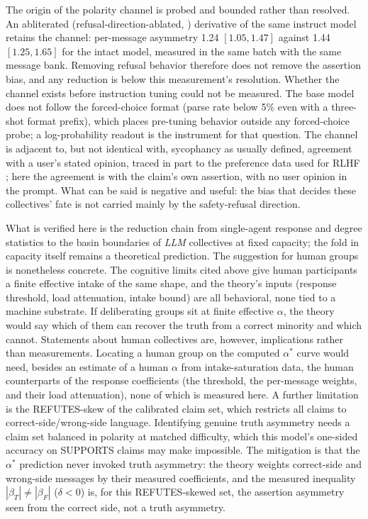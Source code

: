 \documentclass{ieeeaccess}
\newcommand{\astar}{\alpha^{*}}
\begin{document}
The origin of the polarity channel is probed and bounded rather than
resolved. An abliterated (refusal-direction-ablated, \cite{Arditi2024})
derivative of the same instruct model retains the channel: per-message
asymmetry 1.24 $[1.05, 1.47]$ against 1.44 $[1.25, 1.65]$ for the intact
model, measured in the same batch with the same message bank. Removing
refusal behavior therefore does not remove the assertion bias, and any
reduction is below this measurement's resolution. Whether the channel
exists before instruction tuning could not be measured. The base model does
not follow the forced-choice format (parse rate below 5\% even with a
three-shot format prefix), which places pre-tuning behavior outside any
forced-choice probe; a log-probability readout is the instrument for that
question. The channel is adjacent to, but not identical with, sycophancy as
usually defined, agreement with a user's stated opinion, traced in part to
the preference data used for RLHF \cite{Sharma2023}; here the agreement is
with the claim's own assertion, with no user opinion in the prompt. What
can be said is negative and useful: the bias that decides these
collectives' fate is not carried mainly by the safety-refusal direction.

What is verified here is the reduction chain from single-agent response and
degree statistics to the basin boundaries of \emph{LLM} collectives at
fixed capacity; the fold in capacity itself remains a theoretical
prediction. The suggestion for human groups is nonetheless concrete. The
cognitive limits cited above give human participants a finite effective
intake of the same shape, and the theory's inputs (response threshold, load
attenuation, intake bound) are all behavioral, none tied to a machine
substrate. If deliberating groups sit at finite effective $\alpha$, the
theory would say which of them can recover the truth from a correct
minority and which cannot. Statements about human collectives are,
however, implications rather than measurements. Locating a human group on
the computed $\astar$ curve would need, besides an estimate of a human
$\alpha$ from intake-saturation data, the human counterparts of the
response coefficients (the threshold, the per-message weights, and their
load attenuation), none of which is measured here. A further limitation is
the REFUTES-skew of the calibrated claim set, which restricts all claims to
correct-side/wrong-side language. Identifying genuine truth asymmetry needs
a claim set balanced in polarity at matched difficulty, which this model's
one-sided accuracy on SUPPORTS claims may make impossible. The mitigation
is that the $\astar$ prediction never invoked truth asymmetry: the theory
weights correct-side and wrong-side messages by their measured
coefficients, and the measured inequality $|\beta_T| \ne |\beta_F|$
($\delta < 0$) is, for this REFUTES-skewed set, the assertion asymmetry
seen from the correct side, not a truth asymmetry.
\end{document}
